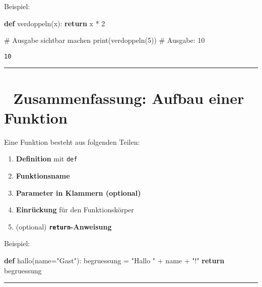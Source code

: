 \documentclass[
  letterpaper,
  DIV=11,
  numbers=noendperiod]{scrreprt}
\newenvironment{Shaded}{\begin{snugshade}}{\end{snugshade}}
\newcommand{\BuiltInTok}[1]{\textcolor[rgb]{0.00,0.23,0.31}{#1}}
\newcommand{\CommentTok}[1]{\textcolor[rgb]{0.37,0.37,0.37}{#1}}
\newcommand{\ControlFlowTok}[1]{\textcolor[rgb]{0.00,0.23,0.31}{\textbf{#1}}}
\newcommand{\DecValTok}[1]{\textcolor[rgb]{0.68,0.00,0.00}{#1}}
\newcommand{\KeywordTok}[1]{\textcolor[rgb]{0.00,0.23,0.31}{\textbf{#1}}}
\newcommand{\NormalTok}[1]{\textcolor[rgb]{0.00,0.23,0.31}{#1}}
\newcommand{\OperatorTok}[1]{\textcolor[rgb]{0.37,0.37,0.37}{#1}}
\newcommand{\StringTok}[1]{\textcolor[rgb]{0.13,0.47,0.30}{#1}}
\providecommand{\tightlist}{%
  \setlength{\itemsep}{0pt}\setlength{\parskip}{0pt}}\usepackage{longtable,booktabs,array}
\begin{document}
\begin{tcolorbox}
Beispiel:

\begin{Shaded}
\begin{Highlighting}[]
\KeywordTok{def}\NormalTok{ verdoppeln(x):}
    \ControlFlowTok{return}\NormalTok{ x }\OperatorTok{*} \DecValTok{2}

\CommentTok{\# Ausgabe sichtbar machen}
\BuiltInTok{print}\NormalTok{(verdoppeln(}\DecValTok{5}\NormalTok{))  }\CommentTok{\# Ausgabe: 10}
\end{Highlighting}
\end{Shaded}

\begin{verbatim}
10
\end{verbatim}

\begin{center}\rule{0.5\linewidth}{0.5pt}\end{center}

\section{🔄 Zusammenfassung: Aufbau einer
Funktion}\label{zusammenfassung-aufbau-einer-funktion}

Eine Funktion besteht aus folgenden Teilen:

\begin{enumerate}
\def\labelenumi{\arabic{enumi}.}
\tightlist
\item
  \textbf{Definition} mit \texttt{def}
\item
  \textbf{Funktionsname}
\item
  \textbf{Parameter in Klammern (optional)}
\item
  \textbf{Einrückung} für den Funktionskörper
\item
  (optional) \textbf{\texttt{return}-Anweisung}
\end{enumerate}

Beispiel:

\begin{Shaded}
\begin{Highlighting}[]
\KeywordTok{def}\NormalTok{ hallo(name}\OperatorTok{=}\StringTok{"Gast"}\NormalTok{):}
\NormalTok{    begruessung }\OperatorTok{=} \StringTok{"Hallo "} \OperatorTok{+}\NormalTok{ name }\OperatorTok{+} \StringTok{"!"}
    \ControlFlowTok{return}\NormalTok{ begruessung}
\end{Highlighting}
\end{Shaded}

\begin{center}\rule{0.5\linewidth}{0.5pt}\end{center}


\end{tcolorbox}
\end{document}
